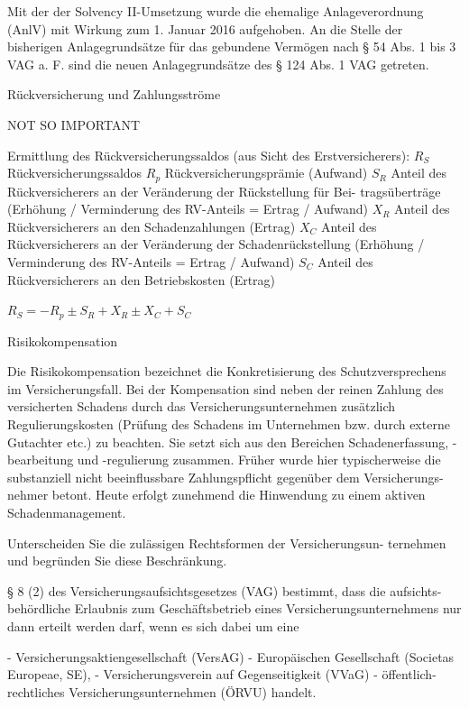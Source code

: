 Mit der der
Solvency II-Umsetzung
wurde die ehemalige Anlageverordnung
(AnlV) mit Wirkung zum 1. Januar 2016 aufgehoben. An die Stelle der bisherigen
Anlagegrundsätze für das gebundene Vermögen nach § 54 Abs. 1 bis 3 VAG a. F.
sind die neuen Anlagegrundsätze des § 124 Abs. 1 VAG getreten.


Rückversicherung und Zahlungsströme


NOT SO IMPORTANT

Ermittlung des Rückversicherungssaldos (aus Sicht des Erstversicherers):
\( R_S \)
Rückversicherungssaldos
\( R_p \)
Rückversicherungsprämie (Aufwand)
\( S_R \)
Anteil des Rückversicherers an der Veränderung der Rückstellung für Bei-
tragsüberträge
(Erhöhung / Verminderung des RV-Anteils = Ertrag / Aufwand)
\( X_R \)
Anteil des Rückversicherers an den Schadenzahlungen (Ertrag)
\( X_C \)
Anteil des Rückversicherers an der Veränderung der Schadenrückstellung
(Erhöhung / Verminderung des RV-Anteils = Ertrag / Aufwand)
\( S_C \)
Anteil des Rückversicherers an den Betriebskosten (Ertrag)

\( R_S = - R_p \pm S_R + X_R \pm X_C + S_C \)

Risikokompensation

Die Risikokompensation bezeichnet die Konkretisierung des Schutzversprechens
im Versicherungsfall. Bei der Kompensation sind neben der reinen Zahlung des versicherten Schadens durch
das Versicherungsunternehmen zusätzlich Regulierungskosten (Prüfung des Schadens im Unternehmen bzw. 
durch externe Gutachter etc.) zu beachten. Sie setzt sich
aus den Bereichen Schadenerfassung, -bearbeitung und -regulierung zusammen.
Früher wurde hier typischerweise die substanziell nicht beeinflussbare Zahlungspflicht gegenüber dem Versicherungs-
nehmer betont. Heute erfolgt zunehmend die Hinwendung zu einem aktiven Schadenmanagement.



Unterscheiden Sie die zulässigen Rechtsformen der Versicherungsun-
ternehmen und begründen Sie diese Beschränkung.


§ 8 (2) des Versicherungsaufsichtsgesetzes (VAG) bestimmt, dass die aufsichts-
behördliche Erlaubnis zum Geschäftsbetrieb eines Versicherungsunternehmens
nur dann erteilt werden darf, wenn es sich dabei um eine 

- Versicherungsaktiengesellschaft (VersAG) 
- Europäischen Gesellschaft (Societas Europeae, SE), 
- Versicherungsverein auf Gegenseitigkeit (VVaG)
- öffentlich-rechtliches Versicherungsunternehmen (ÖRVU) 
handelt.

